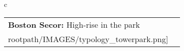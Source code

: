 \begin{table}[H]
        \begin{tabular}{c}
        \begin{tabular}{m{1.5in} m{2in}}
\textbf{Boston Secor:} {High-rise in the park} & \texttt{[image: \\rootpath/IMAGES/typology\_towerpark.png]}
\end{tabular}\end{tabular}
        \end{table}